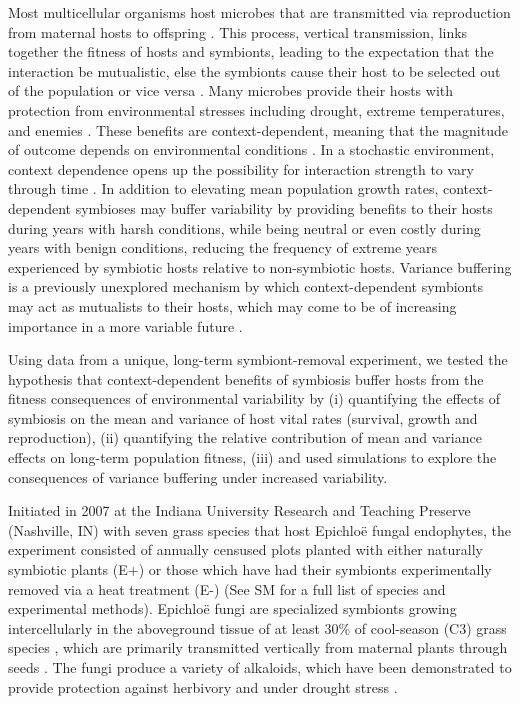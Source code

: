 \documentclass[12pt]{article}
\begin{document}
Most multicellular organisms host microbes that are transmitted via reproduction from maternal hosts to offspring \cite{funkhouser2013mom}.
This process, vertical transmission, links together the fitness of hosts and symbionts, leading to the expectation that the interaction be mutualistic, else the symbionts cause their host to be selected out of the population or vice versa \cite{ewald1987transmission, fine1975vectors}. 
Many microbes provide their hosts with protection from environmental stresses including drought, extreme temperatures, and enemies \cite{russell2006costs, brownlie2009symbiont, kivlin2013fungal,corbin2017heritable, hoadley2019host}. 
These benefits are context-dependent, meaning that the magnitude of outcome depends on environmental conditions \cite{chamberlain2014context}. 
In a stochastic environment, context dependence opens up the possibility for interaction strength to vary through time \cite{jordano1994spatial, billick2003relative}. 
In addition to elevating mean population growth rates, context-dependent symbioses may buffer variability by providing benefits to their hosts during years with harsh conditions, while being neutral or even costly during years with benign conditions, reducing the frequency of extreme years experienced by symbiotic hosts relative to non-symbiotic hosts. 
Variance buffering is a previously unexplored mechanism by which context-dependent symbionts may act as mutualists to their hosts, which may come to be of increasing importance in a more variable future \cite{rudgers2020climate}.

Using data from a unique, long-term symbiont-removal experiment, we tested the hypothesis that context-dependent benefits of symbiosis buffer hosts from the fitness consequences of environmental variability by (i) quantifying the effects of symbiosis on the mean and variance of host vital rates (survival, growth and reproduction), (ii) quantifying the relative contribution of mean and variance effects on long-term population fitness, (iii) and used simulations to explore the consequences of variance buffering under increased variability.

Initiated in 2007 at the Indiana University Research and Teaching Preserve (Nashville, IN) with seven grass species that host Epichlo\"{e} fungal endophytes, the experiment consisted of annually censused plots planted with either naturally symbiotic plants (E+) or those which have had their symbionts experimentally removed  via a heat treatment (E-) (See SM for a full list of species and experimental methods).
Epichlo\"{e} fungi are specialized symbionts growing intercellularly in the aboveground tissue of at least 30\% of cool-season (C3) grass species \cite{leuchtmann1992systematics}, which are primarily transmitted vertically from maternal plants through seeds \cite{cheplick2009ecology, rudgers2009fungus}.
The fungi produce a variety of alkaloids, which have been demonstrated to provide protection against herbivory \cite{brem2001epichloe} and under drought stress \cite{cheplick2004recovery, kannadan2008endophyte, decunta2021systematic}.
\end{document}
